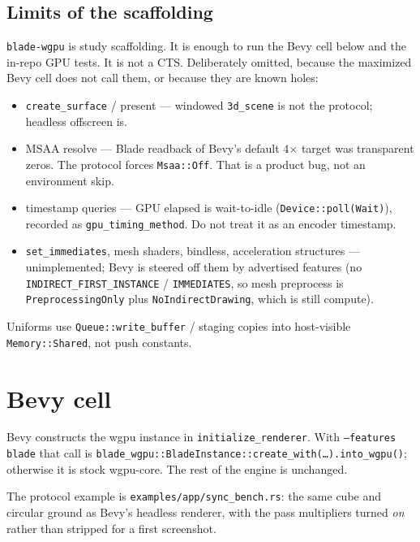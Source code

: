 \documentclass[10pt,twocolumn]{article}
\begin{document}
\subsection{Limits of the scaffolding}

\texttt{blade-wgpu} is study scaffolding. It is enough to run the Bevy
cell below and the in-repo GPU tests. It is not a CTS. Deliberately
omitted, because the maximized Bevy cell does not call them, or because
they are known holes:

\begin{itemize}
  \item \texttt{create\_surface} / present --- windowed \texttt{3d\_scene}
        is not the protocol; headless offscreen is.
  \item MSAA resolve --- Blade readback of Bevy's default 4$\times$ target
        was transparent zeros. The protocol forces \texttt{Msaa::Off}.
        That is a product bug, not an environment skip.
  \item timestamp queries --- GPU elapsed is wait-to-idle
        (\texttt{Device::poll(Wait)}), recorded as
        \texttt{gpu\_timing\_method}. Do not treat it as an encoder
        timestamp.
  \item \texttt{set\_immediates}, mesh shaders, bindless, acceleration
        structures --- unimplemented; Bevy is steered off them by
        advertised features (no \texttt{INDIRECT\_FIRST\_INSTANCE} /
        \texttt{IMMEDIATES}, so mesh preprocess is
        \texttt{PreprocessingOnly} plus \texttt{NoIndirectDrawing},
        which is still compute).
\end{itemize}

Uniforms use \texttt{Queue::write\_buffer} / staging copies into
host-visible \texttt{Memory::Shared}, not push constants.

\section{Bevy cell}

Bevy constructs the wgpu instance in \texttt{initialize\_renderer}. With
\texttt{--features blade} that call is
\texttt{blade\_wgpu::BladeInstance::create\_with(\ldots).into\_wgpu()};
otherwise it is stock wgpu-core. The rest of the engine is unchanged.

The protocol example is \texttt{examples/app/sync\_bench.rs}: the same
cube and circular ground as Bevy's headless renderer, with the pass
multipliers turned \emph{on} rather than stripped for a first screenshot.
\end{document}
